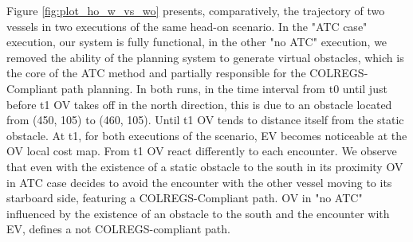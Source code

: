         Figure \ref{fig:plot_ho_w_vs_wo} presents, comparatively, the trajectory of two vessels in two executions of the same head-on scenario. In the "ATC case" execution, our system is fully functional, in the other "no ATC" execution, we removed the ability of the planning system to generate virtual obstacles, which is the core of the ATC method and partially responsible for the COLREGS-Compliant path planning. In both runs, in the time interval from t0 until just before t1 OV takes off in the north direction, this is due to an obstacle located from (450, 105) to (460, 105). Until t1 OV tends to distance itself from the static obstacle. At t1, for both executions of the scenario, EV becomes noticeable at the OV local cost map. From t1 OV react differently to each encounter. We observe that even with the existence of a static obstacle to the south in its proximity OV in ATC case decides to avoid the encounter with the other vessel moving to its starboard side, featuring a COLREGS-Compliant path. OV in "no ATC" influenced by the existence of an obstacle to the south and the encounter with EV, defines a not COLREGS-compliant path.
        
        
            
        
